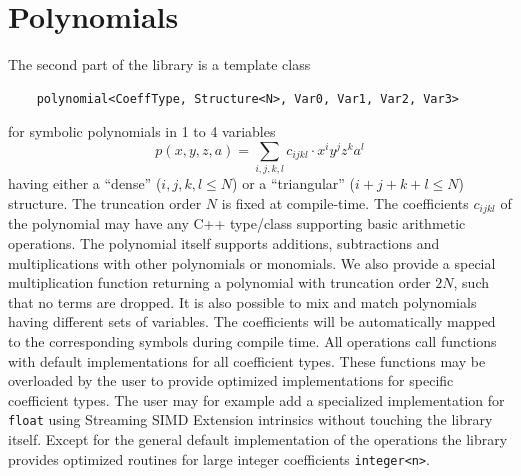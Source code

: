 \documentclass[oribibl,a4paper]{llncs2e/llncs}
\begin{document}
\section{Polynomials}
The second part of the library is a template class 
\begin{verbatim}
    polynomial<CoeffType, Structure<N>, Var0, Var1, Var2, Var3>
\end{verbatim}
for symbolic polynomials in 1 to 4 variables
\begin{equation}
    p(x,y,z,a) = \sum_{i,j,k,l} c_{ijkl} \cdot x^i y^j z^k a^l
\end{equation}
having either a ``dense'' (${i,j,k,l} \le N$) or a ``triangular'' ($i+j+k+l \le N$) structure.
The truncation order $N$ is fixed at compile-time.
The coefficients $c_{ijkl}$ of the polynomial may have any C++ type/class supporting basic arithmetic operations.
The polynomial itself supports additions, subtractions and multiplications with other polynomials or monomials.
We also provide a special multiplication function returning a polynomial with truncation order $2N$, such that no terms are dropped.
It is also possible to mix and match polynomials having different sets of variables.
The coefficients will be automatically mapped to the corresponding symbols during compile time.
All operations call functions with default implementations for all coefficient types.
These functions may be overloaded by the user to provide optimized implementations for specific coefficient types.
The user may for example add a specialized implementation for \verb|float| using Streaming SIMD Extension intrinsics without touching the library itself.
Except for the general default implementation of the operations the library provides optimized routines for large integer coefficients \verb|integer<n>|.

\end{document}
